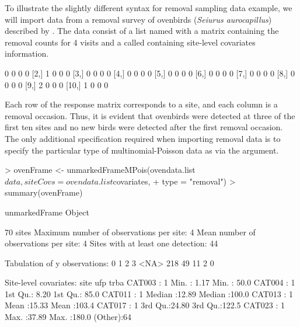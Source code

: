\documentclass[article,shortnames]{jss}
\begin{document}
To illustrate the slightly different syntax for removal sampling data example, 
we will import data from a removal survey of ovenbirds 
({\it Seiurus aurocapillus}) described by \citet{Royle2004a}.  The data consist 
of a list named  with 
a matrix  containing the removal counts for 4 visits and a 
 called  containing site-level covariates 
information.

\begin{Schunk}
\begin{Soutput}
      [,1] [,2] [,3] [,4]
 [1,]    0    0    0    0
 [2,]    1    0    0    0
 [3,]    0    0    0    0
 [4,]    0    0    0    0
 [5,]    0    0    0    0
 [6,]    0    0    0    0
 [7,]    0    0    0    0
 [8,]    0    0    0    0
 [9,]    2    0    0    0
[10,]    1    0    0    0
\end{Soutput}
\end{Schunk}

Each row of the response matrix corresponds to a site, and each column is a 
removal occasion. Thus, it is evident that ovenbirds were detected at three of 
the first ten sites and no new birds were detected after the first removal 
occasion.  The only additional specification required when importing removal 
data is to specify the particular type of multinomial-Poisson data as
 via the  argument.

\begin{Schunk}
\begin{Sinput}
> ovenFrame <- unmarkedFrameMPois(ovendata.list$data, siteCovs = ovendata.list$covariates, 
+     type = "removal")
> summary(ovenFrame)
\end{Sinput}
\begin{Soutput}
unmarkedFrame Object

70 sites
Maximum number of observations per site: 4 
Mean number of observations per site: 4 
Sites with at least one detection: 44 

Tabulation of y observations:
   0    1    2    3 <NA> 
 218   49   11    2    0 

Site-level covariates:
      site         ufp             trba      
 CAT003 : 1   Min.   : 1.17   Min.   : 50.0  
 CAT004 : 1   1st Qu.: 8.20   1st Qu.: 85.0  
 CAT011 : 1   Median :12.89   Median :100.0  
 CAT013 : 1   Mean   :15.33   Mean   :103.4  
 CAT017 : 1   3rd Qu.:24.80   3rd Qu.:122.5  
 CAT023 : 1   Max.   :37.89   Max.   :180.0  
 (Other):64                                  
\end{Soutput}
\end{Schunk}
\end{document}
